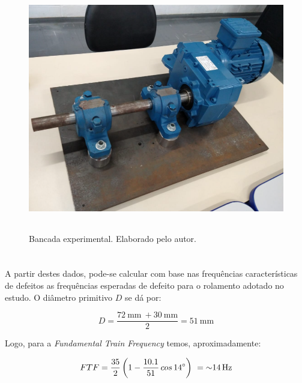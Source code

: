 \documentclass[
	12pt,				
	oneside,			
	a4paper,			
	english,			
	brazil,			
	]{abntex2ppgsi}
\begin{document}
\begin{figure}[H]
\centering
\caption {Bancada experimental. Elaborado pelo autor.}
\includegraphics[width=\textwidth,height=100mm,keepaspectratio]{bancada_de_testes}
\label{bancada_de_testes}
\end{figure}


\section{}

A partir destes dados, pode-se calcular com base nas frequências características de defeitos as frequências esperadas de defeito para o rolamento adotado no estudo. O diâmetro primitivo $D$ se dá por: 

\begin{equation}
	D = \frac{\SI{72}{\mm} \ + \SI{30}{\mm}}{2} = \SI{51}{\mm}
	\label{eq: Diametro Primitivo no Rolamento}
\end{equation}



Logo, para a \textit{Fundamental Train Frequency} temos, aproximadamente:

\begin{equation}
	FTF = \frac{35}{2} \left ( 1 - \frac{10.1}{51} \,cos \, \ang{14} \right )  \ = \SI{~14}{{\hertz}}
	\label{eq: FTF no  Rolamento}
\end{equation}

\end{document}
